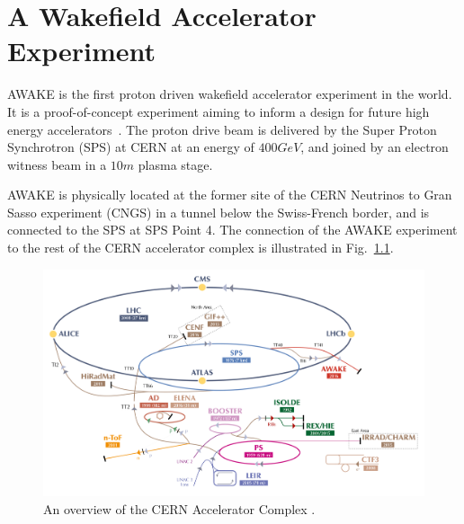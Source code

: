 %
%

\chapter{A Wakefield Accelerator Experiment}
\label{Ch:WFA}

AWAKE is the first proton driven wakefield accelerator experiment in the world. It is a proof-of-concept experiment aiming to inform a design for future high energy accelerators~\cite{gschwendtner:2016}. The proton drive beam is delivered by the Super Proton Synchrotron (SPS) at CERN at an energy of $400\unit{GeV}$, and joined by an electron witness beam in a $10\unit{m}$ plasma stage.

AWAKE is physically located at the former site of the CERN Neutrinos to Gran Sasso experiment (CNGS) \cite{gschwendtner:2010} in a tunnel below the Swiss-French border, and is connected to the SPS at SPS Point 4. The connection of the AWAKE experiment to the rest of the CERN accelerator complex is illustrated in Fig.~\ref{Fig:WFA:AccComp}.

\begin{figure}[hbt]
    \centering
    \includegraphics[width=0.99\linewidth,trim={20mm 0mm 20mm 0mm},clip]{figures/AcceleratorComplex}
    \caption{\label{Fig:WFA:AccComp} An overview of the CERN Accelerator Complex \cite{add:mobs:2016}.}
\end{figure}


